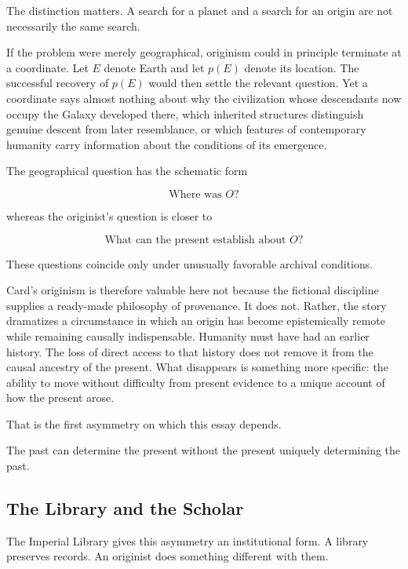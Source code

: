 \documentclass[
  11pt,
  a4paper,
  DIV=12,
  BCOR=0mm,
  parskip=half-
]{scrartcl}
\theoremstyle{definition}
\theoremstyle{plain}
\theoremstyle{remark}
\begin{document}
The distinction matters. A search for a planet and a search for an origin are
not necessarily the same search.

If the problem were merely geographical, originism could in principle
terminate at a coordinate. Let \(E\) denote Earth and let \(p(E)\) denote its
location. The successful recovery of \(p(E)\) would then settle the relevant
question. Yet a coordinate says almost nothing about why the civilization
whose descendants now occupy the Galaxy developed there, which inherited
structures distinguish genuine descent from later resemblance, or which
features of contemporary humanity carry information about the conditions of
its emergence.

The geographical question has the schematic form

\[
  \text{Where was } O?
\]

whereas the originist's question is closer to

\[
  \text{What can the present establish about } O?
\]

These questions coincide only under unusually favorable archival conditions.

Card's originism is therefore valuable here not because the fictional
discipline supplies a ready-made philosophy of provenance. It does not.
Rather, the story dramatizes a circumstance in which an origin has become
epistemically remote while remaining causally indispensable. Humanity must
have had an earlier history. The loss of direct access to that history does
not remove it from the causal ancestry of the present. What disappears is
something more specific: the ability to move without difficulty from present
evidence to a unique account of how the present arose.

That is the first asymmetry on which this essay depends.

The past can determine the present without the present uniquely determining
the past.


\subsection{The Library and the Scholar}
\label{sec:library-scholar}

The Imperial Library gives this asymmetry an institutional form. A library
preserves records. An originist does something different with them.
\end{document}

